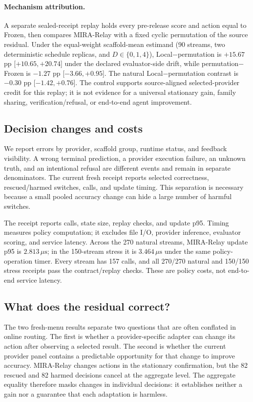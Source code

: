 \documentclass[sigconf,anonymous]{aamas}
\begin{document}
\paragraph{Mechanism attribution.} A separate sealed-receipt replay holds every pre-release score and action equal to Frozen, then compares MIRA-Relay with a fixed cyclic permutation of the source residual. Under the equal-weight scaffold-mean estimand (90 streams, two deterministic schedule replicas, and $D\in\{0,1,4\}$), Local$-$permutation is $+15.67$ pp [$+10.65,+20.74$] under the declared evaluator-side drift, while permutation$-$Frozen is $-1.27$ pp [$-3.66,+0.95$]. The natural Local$-$permutation contrast is $-0.30$ pp [$-1.42,+0.76$]. The control supports source-aligned selected-provider credit for this replay; it is not evidence for a universal stationary gain, family sharing, verification/refusal, or end-to-end agent improvement.

\subsection{Decision changes and costs}
We report errors by provider, scaffold group, runtime status, and feedback visibility. A wrong terminal prediction, a provider execution failure, an unknown truth, and an intentional refusal are different events and remain in separate denominators. The current fresh receipt reports selected correctness, rescued/harmed switches, calls, and update timing. This separation is necessary because a small pooled accuracy change can hide a large number of harmful switches.

The receipt reports calls, state size, replay checks, and update p95. Timing measures policy computation; it excludes file I/O, provider inference, evaluator scoring, and service latency. Across the 270 natural streams, MIRA-Relay update p95 is $2.813\,\mu\mathrm{s}$; in the 150-stream stress it is $3.464\,\mu\mathrm{s}$ under the same policy-operation timer. Every stream has 157 calls, and all 270/270 natural and 150/150 stress receipts pass the contract/replay checks. These are policy costs, not end-to-end service latency.

\subsection{What does the residual correct?}
The two fresh-menu results separate two questions that are often conflated in online routing. The first is whether a provider-specific adapter can change its action after observing a selected result. The second is whether the current provider panel contains a predictable opportunity for that change to improve accuracy. MIRA-Relay changes actions in the stationary confirmation, but the 82 rescued and 82 harmed decisions cancel at the aggregate level. The aggregate equality therefore masks changes in individual decisions: it establishes neither a gain nor a guarantee that each adaptation is harmless.
\end{document}
